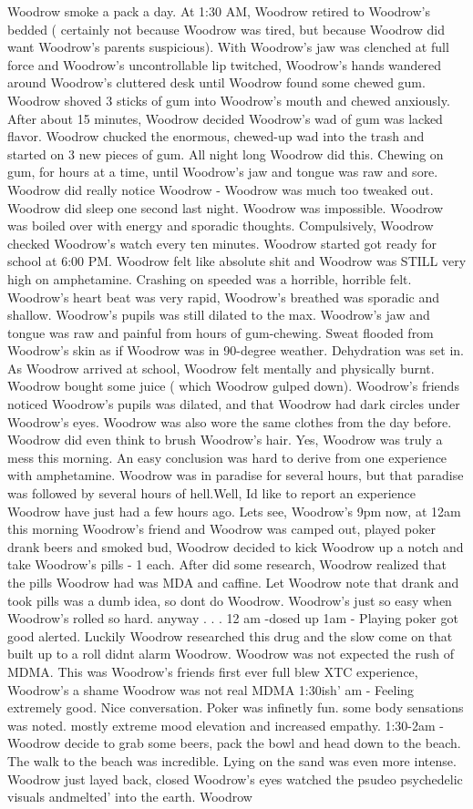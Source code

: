 \documentclass[12pt]{book}
\begin{document}
Woodrow smoke a pack a day. At 1:30 AM, Woodrow retired to Woodrow's bedded ( certainly not because Woodrow was tired, but because Woodrow did want Woodrow's parents suspicious). With Woodrow's jaw was clenched at full force and Woodrow's uncontrollable lip twitched, Woodrow's hands wandered around Woodrow's cluttered desk until Woodrow found some chewed gum. Woodrow shoved 3 sticks of gum into Woodrow's mouth and chewed anxiously. After about 15 minutes, Woodrow decided Woodrow's wad of gum was lacked flavor. Woodrow chucked the enormous, chewed-up wad into the trash and started on 3 new pieces of gum. All night long Woodrow did this. Chewing on gum, for hours at a time, until Woodrow's jaw and tongue was raw and sore. Woodrow did really notice Woodrow - Woodrow was much too tweaked out. Woodrow did sleep one second last night. Woodrow was impossible. Woodrow was boiled over with energy and sporadic thoughts. Compulsively, Woodrow checked Woodrow's watch every ten minutes. Woodrow started got ready for school at 6:00 PM. Woodrow felt like absolute shit and Woodrow was STILL very high on amphetamine. Crashing on speeded was a horrible, horrible felt. Woodrow's heart beat was very rapid, Woodrow's breathed was sporadic and shallow. Woodrow's pupils was still dilated to the max. Woodrow's jaw and tongue was raw and painful from hours of gum-chewing. Sweat flooded from Woodrow's skin as if Woodrow was in 90-degree weather. Dehydration was set in. As Woodrow arrived at school, Woodrow felt mentally and physically burnt. Woodrow bought some juice ( which Woodrow gulped down). Woodrow's friends noticed Woodrow's pupils was dilated, and that Woodrow had dark circles under Woodrow's eyes. Woodrow was also wore the same clothes from the day before. Woodrow did even think to brush Woodrow's hair. Yes, Woodrow was truly a mess this morning. An easy conclusion was hard to derive from one experience with amphetamine. Woodrow was in paradise for several hours, but that paradise was followed by several hours of hell.Well, Id like to report an experience Woodrow have just had a few hours ago. Lets see, Woodrow's 9pm now, at 12am this morning Woodrow's friend and Woodrow was camped out, played poker drank beers and smoked bud, Woodrow decided to kick Woodrow up a notch and take Woodrow's pills - 1 each. After did some research, Woodrow realized that the pills Woodrow had was MDA and caffine. Let Woodrow note that drank and took pills was a dumb idea, so dont do Woodrow. Woodrow's just so easy when Woodrow's rolled so hard. anyway . . .  12 am -dosed up 1am - Playing poker got good alerted. Luckily Woodrow researched this drug and the slow come on that built up to a roll didnt alarm Woodrow. Woodrow was not expected the rush of MDMA. This was Woodrow's friends first ever full blew XTC experience, Woodrow's a shame Woodrow was not real MDMA 1:30ish' am - Feeling extremely good. Nice conversation. Poker was infinetly fun. some body sensations was noted. mostly extreme mood elevation and increased empathy. 1:30-2am - Woodrow decide to grab some beers, pack the bowl and head down to the beach. The walk to the beach was incredible. Lying on the sand was even more intense. Woodrow just layed back, closed Woodrow's eyes watched the psudeo psychedelic visuals andmelted' into the earth. Woodrow 
\end{document}
